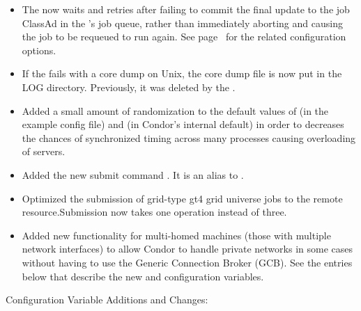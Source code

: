 \begin{itemize}
\item The  now waits and retries after failing to
commit the final update to the job ClassAd in the 's
job queue, rather than immediately aborting and causing the job to be
requeued to run again.  See
page~\pageref{param:ShadowMaxJobCleanupRetries} for the related
configuration options.

\item If the  fails with a core dump on Unix, the
core dump file is now put in the LOG directory.  Previously, it
was deleted by the .

\item Added a small amount of randomization to the default values of
 (in the example config file) and
 (in Condor's internal default) in
order to decreases the chances of synchronized timing across many
processes causing overloading of servers.

\item Added the new submit command . It is an alias
to .

\item Optimized the submission of grid-type gt4 grid universe jobs to the
remote resource.Submission now takes one operation instead of three.

\item Added new functionality for multi-homed machines (those with
  multiple network interfaces) to allow Condor to handle private
  networks in some cases without having to use the Generic Connection
  Broker (GCB).
  See the entries below that describe the new
   and
   configuration variables.

\end{itemize}

\noindent Configuration Variable Additions and Changes:

